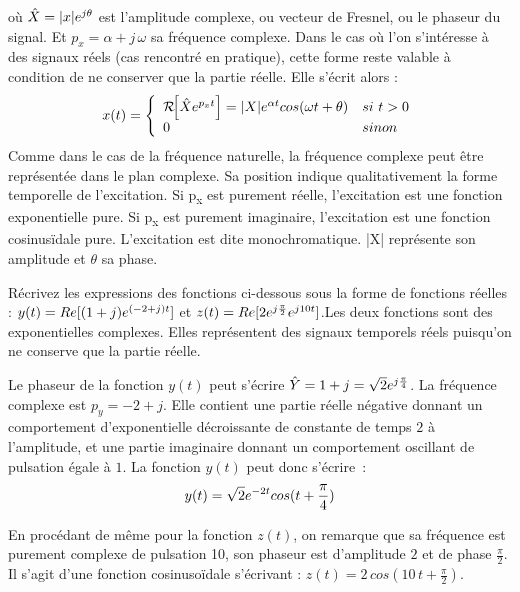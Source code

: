 \begin{remark}{}
	où $ \hat{X} = |x| e^{j \theta}$ est l'amplitude complexe,
        ou vecteur de Fresnel, ou le phaseur du signal. Et
        $p_{x} = \alpha +j\,\omega $ sa fréquence complexe. Dans le
        cas où l'on s'intéresse à des signaux réels (cas rencontré en
        pratique), cette forme reste valable à condition de ne
        conserver que la partie réelle. Elle s'écrit alors :
	\begin{equation}\label{eq:exc_expo_complexe_reel}
          x(t) =    \left \{
            \begin{array}{l l}
              \mathcal{R}\!\!\left[\hat{X}  e^{p_{x}t}\right] = |X|  e^{\alpha t}  cos(\omega t+\theta)  & si~t>0 \\
              0   & sinon \\
            \end{array}
          \right .
	\end{equation}
	Comme dans le cas de la fréquence naturelle, la fréquence
        complexe peut être représentée dans le plan complexe. Sa position
        indique qualitativement la forme temporelle de
        l'excitation. Si p\textsubscript{x} est purement réelle,
        l'excitation est une fonction exponentielle pure. Si
        p\textsubscript{x} est purement imaginaire, l'excitation est
        une fonction cosinusïdale pure. L'excitation est dite
        monochromatique. |X| représente son amplitude et $\theta$ sa
        phase.
	
        \begin{exemple} Récrivez les expressions des fonctions
          ci-dessous sous la forme de fonctions réelles :
          $y(t)=Re[(1+j)e^{(-2+j)t}]$ et
          $z(t) = Re[2e^{j\frac{\pi}{2}}e^{j10t}]$.Les deux
          fonctions sont des exponentielles complexes. Elles
          représentent des signaux temporels réels puisqu'on ne
          conserve que la partie réelle.

          Le phaseur de la fonction
          $y(t)$ peut s'écrire
          $\hat{Y}=1+j=\sqrt{2}e^{j\frac{\pi}{4}}$. La fréquence
          complexe est $p_y=-2+j$. Elle contient une partie réelle
          négative donnant un comportement d'exponentielle
          décroissante de constante de temps $2$ à l'amplitude, et une
          partie imaginaire donnant un comportement oscillant de
          pulsation égale à $1$. La fonction $y(t)$ peut donc s'écrire~:
          \[y(t)={\sqrt{2}}e^{-2t}cos(t+\frac{\pi}{4})\]

          En procédant de même pour la fonction $z(t)$, on remarque
          que sa fréquence est purement complexe de pulsation 10, son
          phaseur est d'amplitude $2$ et de phase $\frac{\pi}{2}$. Il
          s'agit d'une fonction cosinusoïdale s'écrivant :
          $z(t)=2\,cos(10\,t+\frac{\pi}{2})$.
      \end{exemple}
	

\end{remark}

